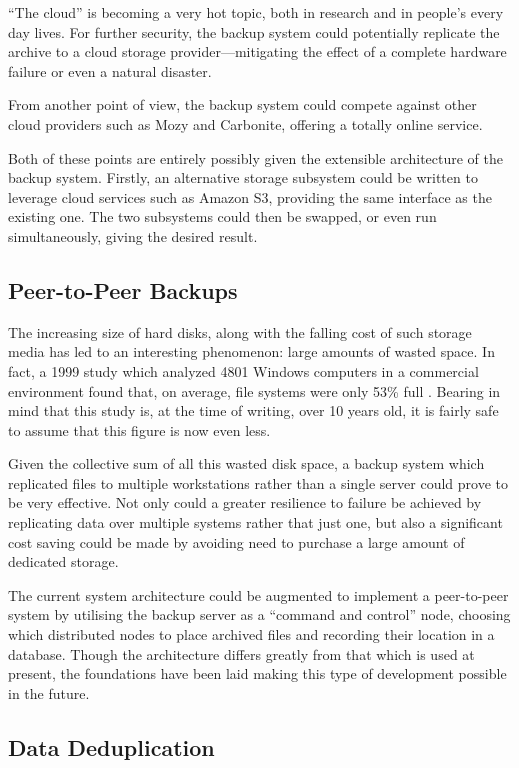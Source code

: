 ``The cloud'' is becoming a very hot topic, both in research and in people's
every day lives. For further security, the backup system could potentially
replicate the archive to a cloud storage provider---mitigating the effect of
a complete hardware failure or even a natural disaster.

From another point of view, the backup system could compete against other cloud
providers such as Mozy and Carbonite, offering a totally online service.

Both of these points are entirely possibly given the extensible architecture of
the backup system. Firstly, an alternative storage subsystem could be written
to leverage cloud services such as Amazon S3, providing the same interface as
the existing one. The two subsystems could then be swapped, or even run
simultaneously, giving the desired result.

\subsection{Peer-to-Peer Backups}

The increasing size of hard disks, along with the falling cost of such storage
media has led to an interesting phenomenon: large amounts of wasted space. In
fact, a 1999 study which analyzed 4801 Windows computers in a commercial
environment found that, on average, file systems were only 53\% full
\cite{douceur1999}. Bearing in mind that this study is, at the time of writing,
over 10 years old, it is fairly safe to assume that this figure is now even less.

Given the collective sum of all this wasted disk space, a backup system which
replicated files to multiple workstations rather than a single server could
prove to be very effective. Not only could a greater resilience to failure be
achieved by replicating data over multiple systems rather that just one, but
also a significant cost saving could be made by avoiding need to purchase
a large amount of dedicated storage.

The current system architecture could be augmented to implement a peer-to-peer
system by utilising the backup server as a ``command and control'' node,
choosing which distributed nodes to place archived files and recording their
location in a database. Though the architecture differs greatly from that which
is used at present, the foundations have been laid making this type of
development possible in the future.

\subsection{Data Deduplication}

